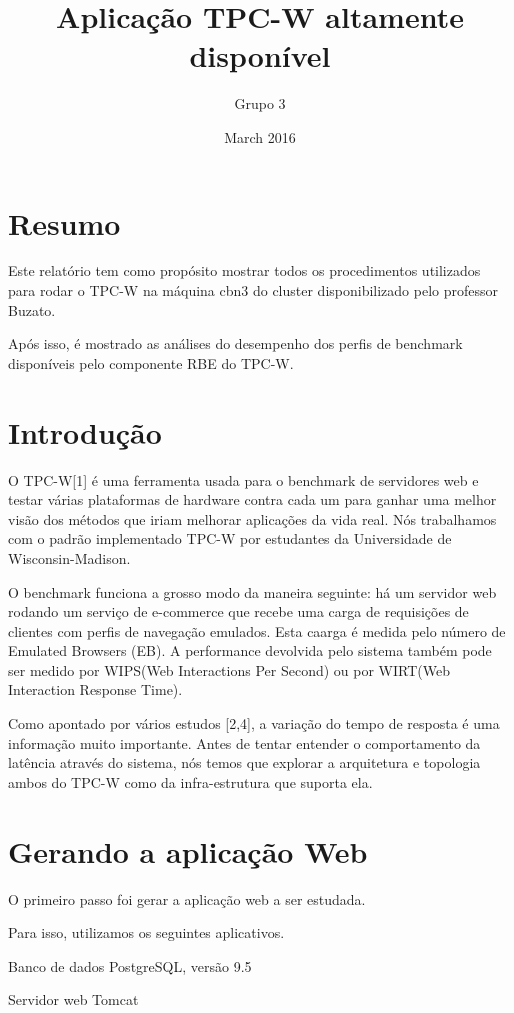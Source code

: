 \documentclass{article}
\title{Aplicação TPC-W altamente disponível}
\author{Grupo 3}
\date{March 2016}
\begin{document}
\maketitle

\section{Resumo}

Este relatório tem como propósito mostrar todos os procedimentos utilizados para rodar o TPC-W na máquina cbn3 do cluster disponibilizado pelo professor Buzato.

Após isso, é mostrado as análises do desempenho dos perfis de benchmark disponíveis pelo componente RBE do TPC-W.

\section{Introdução}
O TPC-W[1] é uma ferramenta usada para o benchmark de servidores web e testar várias plataformas de hardware contra cada um para ganhar uma melhor visão dos métodos que iriam melhorar aplicações da vida real. Nós trabalhamos com o padrão implementado TPC-W por estudantes da Universidade de Wisconsin-Madison.

O benchmark funciona a grosso modo da maneira seguinte: há um servidor web rodando um serviço de e-commerce que recebe uma carga de requisições de clientes com perfis de navegação emulados. Esta caarga é medida pelo número de Emulated Browsers (EB). A performance devolvida pelo sistema também pode ser medido por WIPS(Web Interactions Per Second) ou por WIRT(Web Interaction Response Time).

Como apontado por vários estudos [2,4], a variação do tempo de resposta é uma informação muito importante. Antes de tentar entender o comportamento da latência através do sistema, nós temos que explorar a arquitetura e topologia ambos do TPC-W como da infra-estrutura que suporta ela.




\section{Gerando a aplicação Web}
O primeiro passo foi gerar a aplicação web a ser estudada.

Para isso, utilizamos os seguintes aplicativos.


Banco de dados PostgreSQL, versão 9.5
    
Servidor web Tomcat
    
\end{document}

